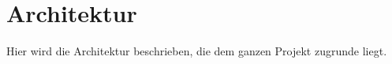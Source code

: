 \chapter{Architektur}
Hier wird die Architektur beschrieben, die dem ganzen Projekt zugrunde liegt.

